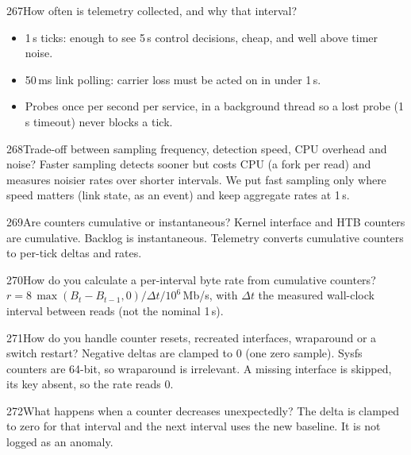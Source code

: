\begin{qa}{267}{How often is telemetry collected, and why that interval?}
\begin{itemize}
\item 1\,s ticks: enough to see 5\,s control decisions, cheap, and well above timer noise.
\item 50\,ms link polling: carrier loss must be acted on in under 1\,s.
\item Probes once per second per service, in a background thread so a lost probe (1\,s timeout) never blocks a tick.
\end{itemize}
\end{qa}

\begin{qa}{268}{Trade-off between sampling frequency, detection speed, CPU overhead and noise?}
Faster sampling detects sooner but costs CPU (a  fork per read) and measures noisier rates over shorter
intervals. We put fast sampling only where speed matters (link state, as an event) and keep aggregate rates at 1\,s.
\end{qa}

\begin{qa}{269}{Are counters cumulative or instantaneous?}
Kernel interface and HTB counters are cumulative. Backlog is instantaneous. Telemetry converts cumulative counters to
per-tick deltas and rates.
\end{qa}

\begin{qa}{270}{How do you calculate a per-interval byte rate from cumulative counters?}
$r=8\,\max(B_t-B_{t-1},0)/\Delta t/10^6$\,Mb/s, with $\Delta t$ the measured wall-clock interval between reads (not the
nominal 1\,s).
\end{qa}

\begin{qa}{271}{How do you handle counter resets, recreated interfaces, wraparound or a switch restart?}
Negative deltas are clamped to 0 (one zero sample). Sysfs counters are 64-bit, so wraparound is irrelevant. A
missing interface is skipped, its key absent, so the rate reads 0.
\end{qa}

\begin{qa}{272}{What happens when a counter decreases unexpectedly?}
The delta is clamped to zero for that interval and the next interval uses the new baseline. It is not logged as an
anomaly.
\end{qa}

